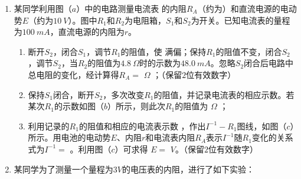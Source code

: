 


\begin{enumerate}[leftmargin=0em]
\renewcommand{\labelenumi}{\arabic{enumi}.}
\item
{}
某同学利用图（$ a $）中的电路测量电流表 \ammetermytikz 的内阻$ R_{A} $（约为）和直流电源的电动势$ E $（约为$ 10\ V $）。图中$ R_{1} $和$ R_{2} $为电阻箱，$ S_{1} $和$ S_{2} $为开关。已知电流表的量程为$ 100\ mA $，直流电源的内阻为$ r $。
\begin{figure}[h!]
\centering

\end{figure}

\begin{enumerate}
\renewcommand{\labelenumi}{\arabic{enumi}.}
\item
断开$ S_{2} $，闭合$ S_{1} $，调节$ R_{1} $的阻值，使 \ammetermytikz 满偏；保持$ R_{1} $的阻值不变，闭合$ S_{2} $，调节$ S_{2} $，当$ R_{2} $的阻值为$ 4.8 \ \Omega $时的示数为$ 48.0\ mA $。忽略$ S_{2} $闭合后电路中总电阻的变化，经计算得$ R_{A}= $  $ \Omega $ ；（保留$ 2 $位有效数字）
\item 
保持$ S_{1} $闭合，断开$ S_{2} $，多次改变$ R_{1} $的阻值，并记录电流表的相应示数。若某次$ R_{1} $的示数如图（$ b $）所示，则此次$ R_{1} $的阻值为  $ \Omega $ ；
\item 
利用记录的$ R_{1} $的阻值和相应的电流表示数  ，作出$ I^{-1}- R_{1} $图线，如图（$ c $）所示。用电池的电动势$ E $、内阻$ r $和电流表内阻$ R_{A} $表示$ I^{-1} $随$ R_{1} $变化的关系式为$ I^{-1}= $  。利用图（$ c $）可求得 $ E= $  
$ V $。（保留$ 2 $位有效数字）

\end{enumerate}

\item 
{}

某同学为了测量一个量程为$ 3V $的电压表的内阻，进行了如下实验：
\begin{figure}[h!]
\centering
 \qquad \qquad 

\end{figure}



\end{enumerate}

